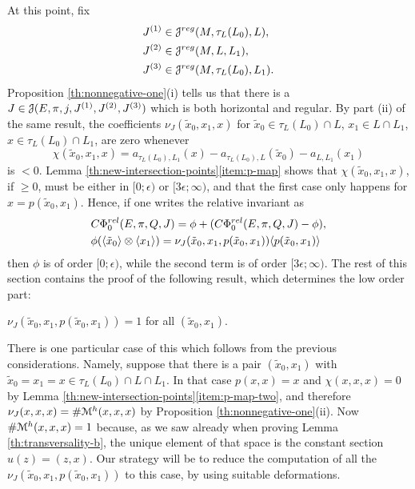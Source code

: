 \documentclass[10pt,letterpaper]{article}
\begin{document}
At this point, fix
\begin{align*}
 & J^{(1)} \in \mathcal{J}^{reg}(M,\tau_L(L_0),L), \\
 & J^{(2)} \in \mathcal{J}^{reg}(M,L,L_1), \\
 & J^{(3)} \in \mathcal{J}^{reg}(M,\tau_L(L_0),L_1).
\end{align*}
Proposition \ref{th:nonnegative-one}(i) tells us that there is a $J \in
\mathcal{J}(E,\pi,j,J^{(1)},J^{(2)},J^{(3)})$ which is both horizontal and regular. By
part (ii) of the same result, the coefficients $\nu_J(\tilde{x}_0,x_1,x)$ for
$\tilde{x}_0 \in \tau_L(L_0) \cap L$, $x_1 \in L \cap L_1$, $x \in \tau_L(L_0)
\cap L_1$, are zero whenever
\begin{equation} \label{eq:action-difference}
\chi(\tilde{x}_0,x_1,x) = a_{\tau_L(L_0),L_1}(x) -
a_{\tau_L(L_0),L}(\tilde{x}_0) - a_{L,L_1}(x_1)
\end{equation}
is $<0$. Lemma \ref{th:new-intersection-points}\ref{item:p-map} shows that
$\chi(\tilde{x}_0,x_1,x)$, if $\geq 0$, must be either in $[0;\epsilon)$ or
$[3\epsilon;\infty)$, and that the first case only happens for $x =
p(\tilde{x}_0,x_1)$. Hence, if one writes the relative invariant as
\begin{equation} \label{eq:split-one}
\begin{split}
 & C\Phi_0^{rel}(E,\pi,Q,J) = \phi + (C\Phi_0^{rel}(E,\pi,Q,J)-\phi), \\
 & \phi(\langle \tilde{x}_0 \rangle \otimes \langle x_1 \rangle) =
 \nu_J(\tilde{x}_0,x_1,p(\tilde{x}_0,x_1)) \langle p(\tilde{x}_0,x_1) \rangle
\end{split}
\end{equation}
then $\phi$ is of order $[0;\epsilon)$, while the second term is of order
$[3\epsilon;\infty)$. The rest of this section contains the proof of the
following result, which determines the low order part:

\begin{prop} \label{th:low-nu}
$\nu_J(\tilde{x}_0,x_1,p(\tilde{x}_0,x_1)) = 1$ for all $(\tilde{x}_0,x_1)$.
\end{prop}

There is one particular case of this which follows from the previous
considerations. Namely, suppose that there is a pair $(\tilde{x}_0,x_1)$ with
$\tilde{x}_0 = x_1 = x \in \tau_L(L_0) \cap L \cap L_1$. In that case $p(x,x) =
x$ and $\chi(x,x,x) = 0$ by Lemma
\ref{th:new-intersection-points}\ref{item:p-map-two}, and therefore
$\nu_J(x,x,x) = \# \mathcal{M}^h(x,x,x)$ by Proposition \ref{th:nonnegative-one}(ii).
Now $\# \mathcal{M}^h(x,x,x) = 1$ because, as we saw already when proving Lemma
\ref{th:transversality-b}, the unique element of that space is the constant
section $u(z) = (z,x)$. Our strategy will be to reduce the computation of all
the $\nu_J(\tilde{x}_0,x_1,p(\tilde{x}_0,x_1))$ to this case, by using suitable
deformations.
\end{document}
